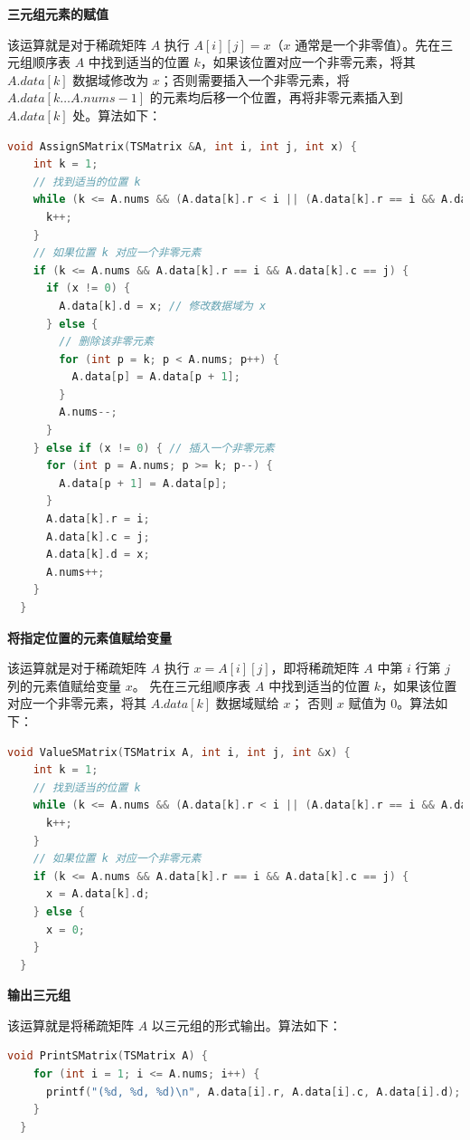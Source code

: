 \documentclass[lang=cn,newtx,10pt,scheme=chinese]{../elegantbook}
\begin{document}
\textbf{三元组元素的赋值}

该运算就是对于稀疏矩阵 $A$ 执行 $A[i][j] = x$（$x$ 通常是一个非零值）。先在三元组顺序表 $A$ 中找到适当的位置 $k$，如果该位置对应一个非零元素，将其 $A.data[k]$ 数据域修改为 $x$；否则需要插入一个非零元素，将 $A.data[k \dots A.nums-1]$ 的元素均后移一个位置，再将非零元素插入到 $A.data[k]$ 处。算法如下：

\begin{lstlisting}[language=C++, caption={稀疏矩阵三元组顺序表的赋值操作}]
  void AssignSMatrix(TSMatrix &A, int i, int j, int x) {
    int k = 1;
    // 找到适当的位置 k
    while (k <= A.nums && (A.data[k].r < i || (A.data[k].r == i && A.data[k].c < j))) {
      k++;
    }
    // 如果位置 k 对应一个非零元素
    if (k <= A.nums && A.data[k].r == i && A.data[k].c == j) {
      if (x != 0) {
        A.data[k].d = x; // 修改数据域为 x
      } else {
        // 删除该非零元素
        for (int p = k; p < A.nums; p++) {
          A.data[p] = A.data[p + 1];
        }
        A.nums--;
      }
    } else if (x != 0) { // 插入一个非零元素
      for (int p = A.nums; p >= k; p--) {
        A.data[p + 1] = A.data[p];
      }
      A.data[k].r = i;
      A.data[k].c = j;
      A.data[k].d = x;
      A.nums++;
    }
  }
\end{lstlisting}

\textbf{将指定位置的元素值赋给变量}

该运算就是对于稀疏矩阵 $A$ 执行 $x = A[i][j]$，即将稀疏矩阵 $A$ 中第 $i$ 行第 $j$ 列的元素值赋给变量 $x$。
先在三元组顺序表 $A$ 中找到适当的位置 $k$，如果该位置对应一个非零元素，将其 $A.data[k]$ 数据域赋给 $x$；
否则 $x$ 赋值为 $0$。算法如下：

\begin{lstlisting}[language=C++, caption={稀疏矩阵三元组顺序表的取值操作}]
  void ValueSMatrix(TSMatrix A, int i, int j, int &x) {
    int k = 1;
    // 找到适当的位置 k
    while (k <= A.nums && (A.data[k].r < i || (A.data[k].r == i && A.data[k].c < j))) {
      k++;
    }
    // 如果位置 k 对应一个非零元素
    if (k <= A.nums && A.data[k].r == i && A.data[k].c == j) {
      x = A.data[k].d;
    } else {
      x = 0;
    }
  }
\end{lstlisting}

\textbf{输出三元组}

该运算就是将稀疏矩阵 $A$ 以三元组的形式输出。算法如下：

\begin{lstlisting}[language=C, caption={输出稀疏矩阵的三元组}]
  void PrintSMatrix(TSMatrix A) {
    for (int i = 1; i <= A.nums; i++) {
      printf("(%d, %d, %d)\n", A.data[i].r, A.data[i].c, A.data[i].d);
    }
  }

\end{lstlisting}
\end{document}
